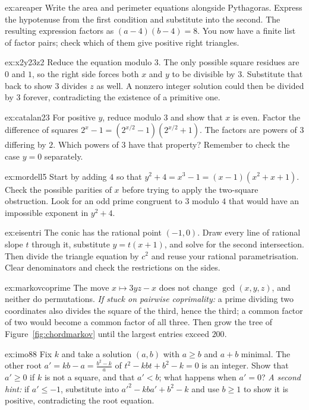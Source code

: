 \begin{hint}{ex:areaper}
Write the area and perimeter equations alongside Pythagoras. Express the hypotenuse from the first condition and substitute into the second. The resulting expression factors as $(a-4)(b-4)=8$. You now have a finite list of factor pairs; check which of them give positive right triangles.
\end{hint}
\begin{hint}{ex:x2y23z2}
Reduce the equation modulo $3$. The only possible square residues are $0$ and $1$, so the right side forces both $x$ and $y$ to be divisible by $3$. Substitute that back to show $3$ divides $z$ as well. A nonzero integer solution could then be divided by $3$ forever, contradicting the existence of a primitive one.
\end{hint}
\begin{hint}{ex:catalan23}
For positive $y$, reduce modulo $3$ and show that $x$ is even. Factor the difference of squares $2^x-1=(2^{x/2}-1)(2^{x/2}+1)$. The factors are powers of $3$ differing by $2$. Which powers of $3$ have that property? Remember to check the case $y=0$ separately.
\end{hint}
\begin{hint}{ex:mordell5}
Start by adding $4$ so that $y^2+4=x^3-1=(x-1)(x^2+x+1)$. Check the possible parities of $x$ before trying to apply the two-square obstruction. Look for an odd prime congruent to $3$ modulo $4$ that would have an impossible exponent in $y^2+4$.
\end{hint}
\begin{hint}{ex:eisentri}
The conic has the rational point $(-1,0)$. Draw every line of rational slope $t$ through it, substitute $y=t(x+1)$, and solve for the second intersection. Then divide the triangle equation by $c^2$ and reuse your rational parametrisation. Clear denominators and check the restrictions on the sides.
\end{hint}
\begin{hint}{ex:markovcoprime}
The move $x\mapsto3yz-x$ does not change $\gcd(x,y,z)$, and neither do permutations. \emph{If stuck on pairwise coprimality:} a prime dividing two coordinates also divides the square of the third, hence the third; a common factor of two would become a common factor of all three. Then grow the tree of Figure~\ref{fig:chordmarkov} until the largest entries exceed $200$.
\end{hint}
\begin{hint}{ex:imo88}
Fix $k$ and take a solution $(a,b)$ with $a\ge b$ and $a+b$ minimal. The other root $a'=kb-a=\frac{b^2-k}a$ of $t^2-kbt+b^2-k=0$ is an integer. Show that $a'\ge0$ if $k$ is not a square, and that $a'<b$; what happens when $a'=0$? \emph{A second hint:} if $a'\le-1$, substitute into $a'^2-kba'+b^2-k$ and use $b\ge1$ to show it is positive, contradicting the root equation.
\end{hint}

